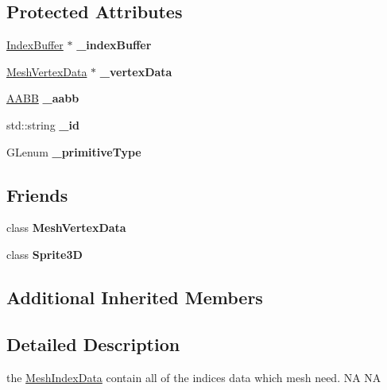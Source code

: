 \subsection*{Protected Attributes}
\begin{DoxyCompactItemize}
\item 
\mbox{\label{classMeshIndexData_ae4ee67c57b80303d58711bd9a7bff7ef}} 
\hyperlink{classIndexBuffer}{Index\+Buffer} $\ast$ {\bfseries \+\_\+index\+Buffer}
\item 
\mbox{\label{classMeshIndexData_a29924950a242a6b991076e079d938e95}} 
\hyperlink{classMeshVertexData}{Mesh\+Vertex\+Data} $\ast$ {\bfseries \+\_\+vertex\+Data}
\item 
\mbox{\label{classMeshIndexData_a9eff889b9927b109b0e23ce9735e6e26}} 
\hyperlink{classAABB}{A\+A\+BB} {\bfseries \+\_\+aabb}
\item 
\mbox{\label{classMeshIndexData_a85ce7e11134c5045e72b0fc764b96f7b}} 
std\+::string {\bfseries \+\_\+id}
\item 
\mbox{\label{classMeshIndexData_ad6c4ee95b1c3ce1344fd843dff27c92d}} 
G\+Lenum {\bfseries \+\_\+primitive\+Type}
\end{DoxyCompactItemize}
\subsection*{Friends}
\begin{DoxyCompactItemize}
\item 
\mbox{\label{classMeshIndexData_ac2bbe0832457ea1e4a956f3afcb15390}} 
class {\bfseries Mesh\+Vertex\+Data}
\item 
\mbox{\label{classMeshIndexData_af6c4966aafabcc15b700aea1c2e12528}} 
class {\bfseries Sprite3D}
\end{DoxyCompactItemize}
\subsection*{Additional Inherited Members}


\subsection{Detailed Description}
the \hyperlink{classMeshIndexData}{Mesh\+Index\+Data} contain all of the indices data which mesh need.  NA  NA 

